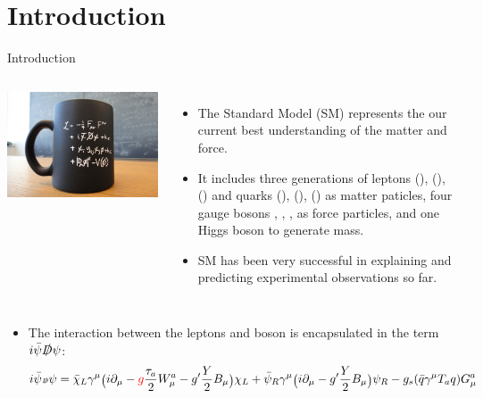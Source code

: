 \section{Introduction}

\begin{frame}{Introduction}
\smaller
    
    \begin{columns}
        \includegraphics[width=\textwidth]{slides/figures/cernmug.jpeg}
        \begin{itemize} 
            \item The Standard Model (SM) represents the our current best understanding of the matter and force.
            \item It includes three generations of leptons (\Pe\PGne), (\PGm\PGnGm), (\PGt\PGnGt) and quarks (\PQu\PQd), (\PQc\PQs), (\PQt\PQb) as matter paticles, four gauge bosons \PGg, \PW, \PZ, \Pg as force particles, and one Higgs boson to generate mass.
            \item SM has been very successful in explaining and predicting experimental observations so far.
        \end{itemize}
    \end{columns}
    
    \vspace{0.05\textheight}
    \begin{itemize}
        \item The interaction between the leptons and \PW boson is encapsulated in the term $i\bar{\psi}\slashed{D}\psi$:
        \begin{equation*} \tiny
            i\bar{\psi}\slashed{D}\psi = 
            \bar{\chi}_L \gamma^\mu \big( i \partial_\mu  - \textcolor{red}{g} \frac{\tau_a}{2} W^a_\mu  -g'\frac{Y}{2} B_\mu \big) \chi_L 
            + \bar{\psi}_R \gamma^\mu \big( i \partial_\mu -g'\frac{Y}{2} B_\mu \big) \psi_R 
            - g_s (\bar{q}\gamma^\mu  T_{a} q) G_\mu^a 
        \end{equation*}
    \end{itemize}
\end{frame}



